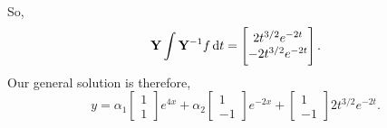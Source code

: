 \begin{example}
\begin{align*}
    \end{align*}
    So,
    $$\mathbf{Y}\int \mathbf{Y}^{-1} f \dif t = \begin{bmatrix} 2t^{3/2}e^{-2t} \\ -2t^{3/2}e^{-2t}\end{bmatrix}.$$
    Our general solution is therefore,
    $$y = \alpha_1 \begin{bmatrix} 1 \\ 1 \end{bmatrix}e^{4x} + \alpha_2
    \begin{bmatrix} 1 \\ -1 \end{bmatrix}e^{-2x}+\begin{bmatrix} 1 \\ -1\end{bmatrix}2t^{3/2}e^{-2t}.$$
\end{example}
\newpage
